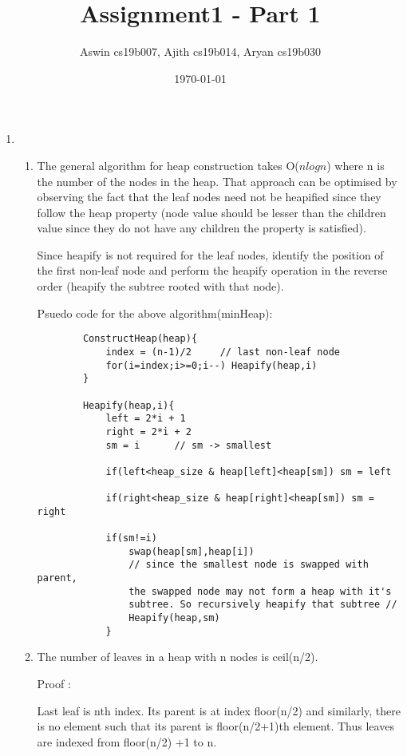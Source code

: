 \documentclass[12pt]{article}
\title{Assignment1 - Part 1}
\author{Aswin cs19b007, Ajith cs19b014, Aryan cs19b030}
\date{\today}
\begin{document}
\maketitle

\newpage
\begin{enumerate}
    \item\begin{enumerate}
        \item The general algorithm for heap construction takes O($nlogn$) where n is the number of the nodes in the heap. That approach can be optimised by observing the fact that the leaf nodes need not be heapified since they follow the heap property (node value should be lesser than the children value since they do not have any children the property is satisfied). 
        
        Since heapify is not required for the leaf nodes, identify the position of the first non-leaf node and perform the heapify operation in the reverse order (heapify the subtree rooted with that node). 
        
        Psuedo code for the above algorithm(minHeap):
        \begin{verbatim}
        ConstructHeap(heap){
            index = (n-1)/2     // last non-leaf node
            for(i=index;i>=0;i--) Heapify(heap,i)
        }
        
        Heapify(heap,i){
            left = 2*i + 1
            right = 2*i + 2
            sm = i      // sm -> smallest
            
            if(left<heap_size & heap[left]<heap[sm]) sm = left
            
            if(right<heap_size & heap[right]<heap[sm]) sm = right
            
            if(sm!=i)
                swap(heap[sm],heap[i])
                // since the smallest node is swapped with parent, 
                the swapped node may not form a heap with it's 
                subtree. So recursively heapify that subtree //
                Heapify(heap,sm) 
            }
        \end{verbatim}    
        \item The number of leaves in a heap with n nodes is ceil(n/2).
        
        Proof : 
        
        Last leaf is nth index. Its parent is at index floor(n/2) and similarly,
        there is no element such that its parent is floor(n/2+1)th element.
        Thus leaves are indexed from floor(n/2) +1 to n.


\end{enumerate}
\end{enumerate}
\end{document}
